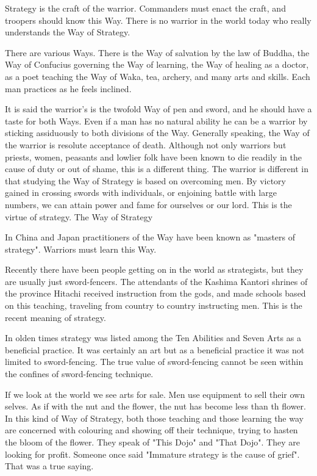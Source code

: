 
Strategy is the craft of the warrior. Commanders must enact the craft, and troopers should know this Way. There is no warrior in the world today who really understands the Way of Strategy.

There are various Ways. There is the Way of salvation by the law of Buddha, the Way of Confucius governing the Way of learning, the Way of healing as a doctor, as a poet teaching the Way of Waka, tea, archery, and many arts and skills. Each man practices as he feels inclined.

It is said the warrior's is the twofold Way of pen and sword, and he should have a taste for both Ways. Even if a man has no natural ability he can be a warrior by sticking assiduously to both divisions of the Way. Generally speaking, the Way of the warrior is resolute acceptance of death. Although not only warriors but priests, women, peasants and lowlier folk have been known to die readily in the cause of duty or out of shame, this is a different thing. The warrior is different in that studying the Way of Strategy is based on overcoming men. By victory gained in crossing swords with individuals, or enjoining battle with large numbers, we can attain power and fame for ourselves or our lord. This is the virtue of strategy.
The Way of Strategy

In China and Japan practitioners of the Way have been known as "masters of strategy". Warriors must learn this Way.

Recently there have been people getting on in the world as strategists, but they are usually just sword-fencers. The attendants of the Kashima Kantori shrines of the province Hitachi received instruction from the gods, and made schools based on this teaching, traveling from country to country instructing men. This is the recent meaning of strategy.

In olden times strategy was listed among the Ten Abilities and Seven Arts as a beneficial practice. It was certainly an art but as a beneficial practice it was not limited to sword-fencing. The true value of sword-fencing cannot be seen within the confines of sword-fencing technique.

If we look at the world we see arts for sale. Men use equipment to sell their own selves. As if with the nut and the flower, the nut has become less than th flower. In this kind of Way of Strategy, both those teaching and those learning the way are concerned with colouring and showing off their technique, trying to hasten the bloom of the flower. They speak of "This Dojo" and "That Dojo". They are looking for profit. Someone once said "Immature strategy is the cause of grief". That was a true saying.

